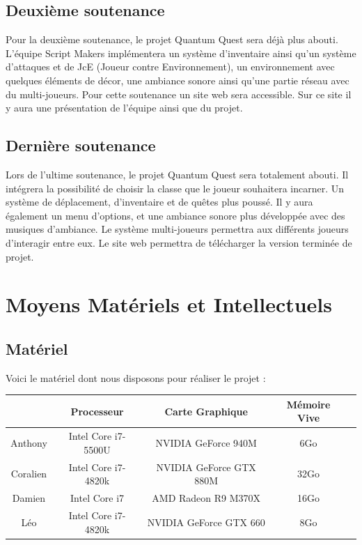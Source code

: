 \documentclass[A4paper,11pt]{article}
\begin{document}
\subsection{Deuxi\`eme soutenance}
Pour la deuxi\`eme soutenance, le projet Quantum Quest sera d\'ej\`a plus abouti. L'\'equipe Script Makers impl\'ementera un syst\`eme d'inventaire ainsi qu'un syst\`eme d'attaques et de JcE (Joueur contre Environnement), un environnement avec quelques \'el\'ements de d\'ecor, une ambiance sonore ainsi qu'une partie r\'eseau avec du multi-joueurs. Pour cette soutenance un site web sera accessible. Sur ce site il y aura une pr\'esentation de l'\'equipe ainsi que du projet.\\
\subsection{Derni\`ere soutenance}
Lors de l'ultime soutenance, le projet Quantum Quest sera totalement abouti. Il int\'egrera la possibilit\'e de choisir la classe que le joueur souhaitera incarner. Un syst\`eme de d\'eplacement, d'inventaire et de qu\^etes plus pouss\'e. Il y aura \'egalement un menu d'options, et une ambiance sonore plus d\'evelopp\'ee avec des musiques d'ambiance. Le syst\`eme multi-joueurs permettra aux diff\'erents joueurs d'interagir entre eux. Le site web permettra de t\'el\'echarger la version termin\'ee de projet.\\

\section{Moyens Mat\'eriels et Intellectuels}

\subsection{Mat\'eriel}
Voici le mat\'eriel dont nous disposons pour r\'ealiser le projet :\\
\begin{center}
\begin{tabular}{|c|c|c|c|c|}
\hline
 & Processeur & Carte Graphique & M\'emoire Vive\\
\hline
Anthony & Intel Core i7-5500U & NVIDIA GeForce 940M & 6Go \\
\hline
Coralien & Intel Core i7-4820k & NVIDIA GeForce GTX 880M & 32Go \\
\hline
Damien & Intel Core i7 & AMD Radeon R9 M370X & 16Go \\
\hline
L\'eo & Intel Core i7-4820k & NVIDIA GeForce GTX 660 & 8Go \\
\hline

\end{tabular}
\end{center}
\end{document}
